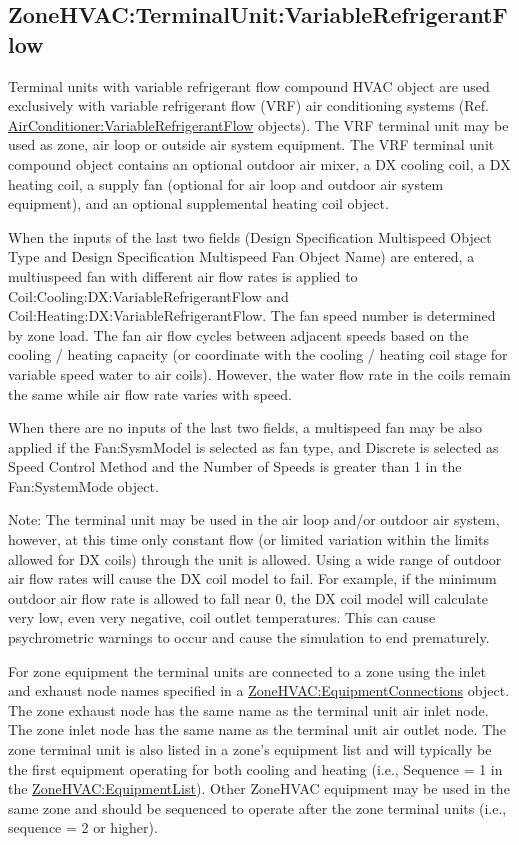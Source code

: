 \subsection{ZoneHVAC:TerminalUnit:VariableRefrigerantFlow}\label{zonehvacterminalunitvariablerefrigerantflow}

Terminal units with variable refrigerant flow compound HVAC object are used exclusively with variable refrigerant flow (VRF) air conditioning systems (Ref. \hyperref[airconditionervariablerefrigerantflow]{AirConditioner:VariableRefrigerantFlow} objects). The VRF terminal unit may be used as zone, air loop or outside air system equipment. The VRF terminal unit compound object contains an optional outdoor air mixer, a DX cooling coil, a DX heating coil, a supply fan (optional for air loop and outdoor air system equipment), and an optional supplemental heating coil object.

When the inputs of the last two fields (Design Specification Multispeed Object Type and Design Specification Multispeed Fan Object Name) are entered, a multiuspeed fan with different air flow rates is applied to Coil:Cooling:DX:VariableRefrigerantFlow and Coil:Heating:DX:VariableRefrigerantFlow.  The fan speed number is determined by zone load. The fan air flow cycles between adjacent speeds based on the cooling / heating capacity (or coordinate with the cooling / heating coil stage for variable speed water to air coils). However, the water flow rate in the coils remain the same while air flow rate varies with speed.

When there are no inputs of the last two fields, a multispeed fan may be also applied if the Fan:SysmModel is selected as fan type, and Discrete is selected as Speed Control Method and the Number of Speeds is greater than 1 in the Fan:SystemMode object. 


\begin{callout}
Note: The terminal unit may be used in the air loop and/or outdoor air system, however, at this time only constant flow (or limited variation within the limits allowed for DX coils) through the unit is allowed. Using a wide range of outdoor air flow rates will cause the DX coil model to fail. For example, if the minimum outdoor air flow rate is allowed to fall near 0, the DX coil model will calculate very low, even very negative, coil outlet temperatures. This can cause psychrometric warnings to occur and cause the simulation to end prematurely.
\end{callout}

For zone equipment the terminal units are connected to a zone using the inlet and exhaust node names specified in a \hyperref[zonehvacequipmentconnections]{ZoneHVAC:EquipmentConnections} object. The zone exhaust node has the same name as the terminal unit air inlet node. The zone inlet node has the same name as the terminal unit air outlet node. The zone terminal unit is also listed in a zone's equipment list and will typically be the first equipment operating for both cooling and heating (i.e., Sequence = 1 in the \hyperref[zonehvacequipmentlist]{ZoneHVAC:EquipmentList}). Other ZoneHVAC equipment may be used in the same zone and should be sequenced to operate after the zone terminal units (i.e., sequence = 2 or higher).

